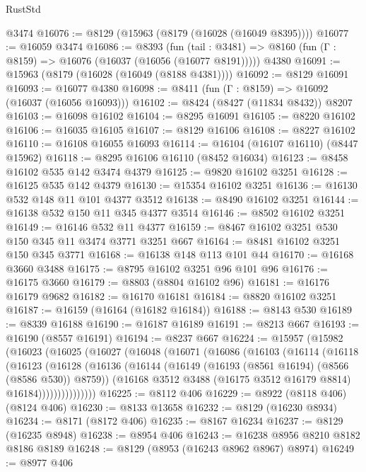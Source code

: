 \begin{lexlean}{RustStd}
\begin{coremodule}
    @3474
@16076 := @8129 (@15963 (@8179 (@16028 (@16049 @8395))))
@16077 := @16059 @3474
@16086 := @8393
    (fun (tail : @3481) => @8160 (fun (Γ : @8159) => @16076 (@16037 (@16056 (@16077 @8191)))))
    @4380
@16091 := @15963 (@8179 (@16028 (@16049 (@8188 @4381))))
@16092 := @8129 @16091
@16093 := @16077 @4380
@16098 := @8411 (fun (Γ : @8159) => @16092 (@16037 (@16056 @16093)))
@16102 := @8424 (@8427 (@11834 @8432)) @8207
@16103 := @16098 @16102
@16104 := @8295 @16091
@16105 := @8220 @16102
@16106 := @16035 @16105
@16107 := @8129 @16106
@16108 := @8227 @16102
@16110 := @16108 @16055 @16093
@16114 := @16104 (@16107 @16110) (@8447 @15962)
@16118 := @8295 @16106 @16110 (@8452 @16034)
@16123 := @8458 @16102 @535 @142 @3474 @4379
@16125 := @9820 @16102 @3251
@16128 := @16125 @535 @142 @4379
@16130 := @15354 @16102 @3251
@16136 := @16130 @532 @148 @11 @101 @4377 @3512
@16138 := @8490 @16102 @3251
@16144 := @16138 @532 @150 @11 @345 @4377 @3514
@16146 := @8502 @16102 @3251
@16149 := @16146 @532 @11 @4377
@16159 := @8467 @16102 @3251 @530 @150 @345 @11 @3474 @3771 @3251 @667
@16164 := @8481 @16102 @3251 @150 @345 @3771
@16168 := @16138 @148 @113 @101 @44
@16170 := @16168 @3660 @3488
@16175 := @8795 @16102 @3251 @96 @101 @96
@16176 := @16175 @3660
@16179 := @8803 (@8804 @16102 @96)
@16181 := @16176 @16179 @9682
@16182 := @16170 @16181
@16184 := @8820 @16102 @3251
@16187 := @16159 (@16164 (@16182 @16184))
@16188 := @8143 @530
@16189 := @8339 @16188
@16190 := @16187 @16189
@16191 := @8213 @667
@16193 := @16190 (@8557 @16191)
@16194 := @8237 @667
@16224 := @15957
    (@15982
      (@16023
        (@16025
          (@16027
            (@16048
              (@16071
                (@16086
                  (@16103
                    (@16114
                      (@16118
                        (@16123
                          (@16128
                            (@16136
                              (@16144
                                (@16149 (@16193 (@8561 @16194) (@8566 (@8586 @530)) @8759))
                                (@16168
                                  @3512
                                  @3488
                                  (@16175 @3512 @16179 @8814)
                                  @16184)))))))))))))))
@16225 := @8112 @406
@16229 := @8922 (@8118 @406) (@8124 @406)
@16230 := @8133 @13658
@16232 := @8129 (@16230 @8934)
@16234 := @8171 (@8172 @406)
@16235 := @8167 @16234
@16237 := @8129 (@16235 @8948)
@16238 := @8954 @406
@16243 := @16238 @8956 @8210 @8182 @8186 @8189
@16248 := @8129 (@8953 (@16243 @8962 @8967) @8974)
@16249 := @8977 @406

\end{coremodule}
\end{lexlean}
